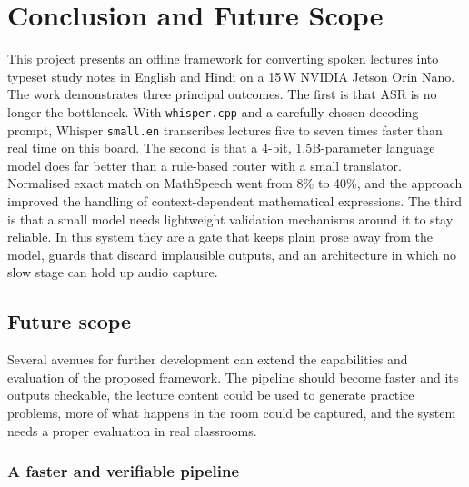 \documentclass[11pt,a4paper,oneside]{report}
\theoremstyle{definition}
\begin{document}
\chapter{Conclusion and Future Scope}
\label{chap:conclusion}

This project presents an offline framework for converting spoken lectures into typeset study notes in English and Hindi on a 15\,W NVIDIA Jetson Orin Nano. The work demonstrates three principal outcomes. The first is that ASR is no longer the bottleneck. With \texttt{whisper.cpp} and a carefully chosen decoding prompt, Whisper \texttt{small.en} transcribes lectures five to seven times faster than real time on this board. The second is that a 4-bit, 1.5B-parameter language model does far better than a rule-based router with a small translator. Normalised exact match on MathSpeech went from 8\% to 40\%, and the approach improved the handling of context-dependent mathematical expressions. The third is that a small model needs lightweight validation mechanisms around it to stay reliable. In this system they are a gate that keeps plain prose away from the model, guards that discard implausible outputs, and an architecture in which no slow stage can hold up audio capture.

\section{Future scope}
\label{sec:future}
Several avenues for further development can extend the capabilities and evaluation of the proposed framework. The pipeline should become faster and its outputs checkable, the lecture content could be used to generate practice problems, more of what happens in the room could be captured, and the system needs a proper evaluation in real classrooms.

\subsection{A faster and verifiable pipeline}
\end{document}
